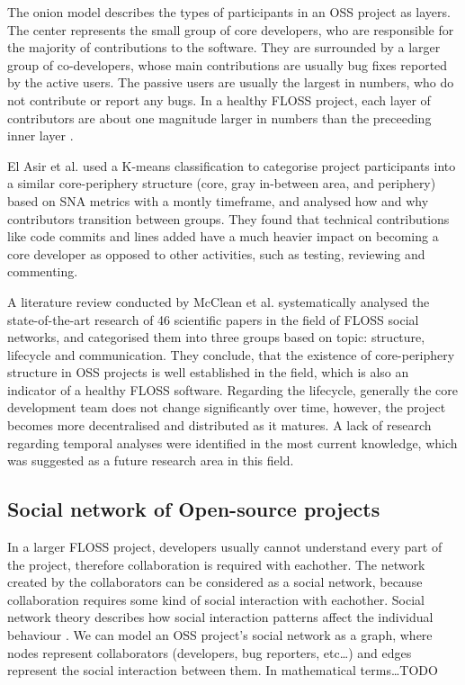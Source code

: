 The onion model describes the types of participants in an OSS project as layers. The center represents the small group of core developers, who are responsible for the majority of contributions to the software. They are surrounded by a larger group of co-developers, whose main contributions are usually bug fixes reported by the active users. The passive users are usually the largest in numbers, who do not contribute or report any bugs. In a healthy FLOSS project, each layer of contributors are about one magnitude larger in numbers than the preceeding inner layer \cite{mockusTwoCaseStudies2002}.

El Asir et al. \cite{elasriPeripheryCoreTemporal2017} used a K-means classification to categorise project participants into a similar core-periphery structure (core, gray in-between area, and periphery) based on SNA metrics with a montly timeframe, and analysed how and why contributors transition between groups. They found that technical contributions like code commits and lines added have a much heavier impact on becoming a core developer as opposed to other activities, such as testing, reviewing and commenting.

A literature review conducted by McClean et al. \cite{mccleanSocialNetworkAnalysis2021} systematically analysed the state-of-the-art research of 46 scientific papers in the field of FLOSS social networks, and categorised them into three groups based on topic: structure, lifecycle and communication. They conclude, that the existence of core-periphery structure in OSS projects is well established in the field, which is also an indicator of a healthy FLOSS software. Regarding the lifecycle, generally the core development team does not change significantly over time, however, the project becomes more decentralised and distributed as it matures. A lack of research regarding temporal analyses were identified in the most current knowledge, which was suggested as a future research area in this field.

\subsection{Social network of Open-source projects}
In a larger FLOSS project, developers usually cannot understand every part of the project, therefore collaboration is required with eachother. The network created by the collaborators can be considered as a social network, because collaboration requires some kind of social interaction with eachother. Social network theory describes how social interaction patterns affect the individual behaviour \cite{martinez-torresGeneticSearchPatterns2012}. We can model an OSS project's social network as a graph, where nodes represent collaborators (developers, bug reporters, etc\dots) and edges represent the social interaction between them. In mathematical terms\dots TODO

